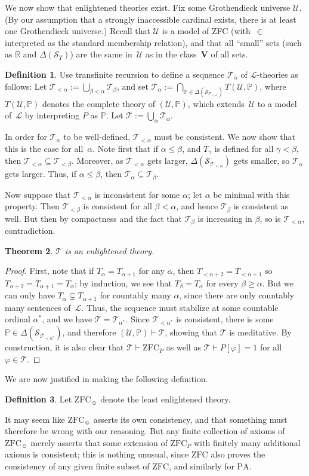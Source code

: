 \documentclass[12pt]{article}
\newcommand{\PP}{\mathbb{P}}
\newcommand{\vp}{\varphi}
\newcommand{\RR}{\mathbb{R}}
\newcommand{\zfc}{\mathrm{ZFC}}
\newcommand{\zfcp}{{\zfc_P}}
\newcommand{\zfch}{{\zfc_{\smiley}}}
\newcommand{\pa}{\mathrm{PA}}
\newcommand{\cL}{\mathcal{L}}
\newcommand{\cS}{\mathcal{S}}
\newcommand{\cT}{\mathcal{T}}
\newcommand{\cU}{\mathcal{U}}
\theoremstyle{plain}
\newtheorem{theorem}{Theorem}[subsection]
\theoremstyle{definition}
\newtheorem{definition}[theorem]{Definition}
\theoremstyle{remark}
\begin{document}
We now show that enlightened theories exist.
Fix some Grothendieck universe $\cU$. (By our assumption that a strongly inaccessible cardinal exists, there is at least one Grothendieck universe.) Recall that $\cU$ is a model of ZFC (with~$\in$ interpreted as the standard membership relation), and that all ``small'' sets (such as $\RR$ and $\Delta(\cS_T)$) are the same in~$\cU$ as in the class~$\mathbf{V}$ of all sets.
\begin{definition}
Use transfinite recursion to define a sequence $\cT_\alpha$ of $\cL$-theories as follows: Let $\cT_{<\alpha} := \bigcup_{\beta<\alpha} \cT_\beta$, and set $\cT_\alpha := \bigcap_{\PP\in\Delta(\cS_{\cT_{<\alpha}})} T(\cU,\PP)$, where $T(\cU,\PP)$ denotes the complete theory of $(\cU,\PP)$, which extends~$\cU$ to a model of~$\cL$ by interpreting $P$ as $\PP$.
Let $\cT := \bigcup_\alpha \cT_\alpha$.
\end{definition}
In order for $\cT_\alpha$ to be well-defined, $\cT_{<\alpha}$ must be consistent. We now show that this is the case for all~$\alpha$.
Note first that if $\alpha\le\beta$, and $T_\gamma$ is defined for all $\gamma<\beta$, then $\cT_{<\alpha}\subseteq\cT_{<\beta}$. Moreover, as $\cT_{<\alpha}$ gets larger, $\Delta(\cS_{\cT_{<\alpha}})$ gets smaller, so $\cT_\alpha$ gets larger. Thus, if $\alpha\le\beta$, then $\cT_\alpha\subseteq\cT_\beta$.

Now suppose that $\cT_{<\alpha}$ is inconsistent for some $\alpha$; let $\alpha$ be minimal with this property. Then $\cT_{<\beta}$ is consistent for all $\beta<\alpha$, and hence $\cT_\beta$ is consistent as well. But then by compactness and the fact that $\cT_\beta$ is increasing in $\beta$, so is $\cT_{<\alpha}$, contradiction.
\begin{theorem}
$\cT$ is an enlightened theory.
\end{theorem}
\begin{proof}
First, note that if $T_{\alpha}= T_{\alpha+1}$ for any $\alpha$, then $T_{<\alpha+2} = T_{<\alpha+1}$ so $T_{\alpha+2} = T_{\alpha+1} = T_\alpha$; by induction, we see that $T_\beta = T_\alpha$ for every $\beta\ge\alpha$. But we can only have $T_{\alpha}\subsetneq T_{\alpha+1}$ for countably many $\alpha$, since there are only countably many sentences of~$\cL$. Thus, the sequence must stabilize at some countable ordinal $\alpha^*$, and we have $\cT = \cT_{\alpha^*}$. Since $\cT_{<\alpha^*}$ is consistent, there is some $\PP\in\Delta(\cS_{\cT_{<\alpha^*}})$, and therefore $(\cU,\PP)\vdash\cT$, showing that $\cT$ is meditative. By construction, it is also clear that $\cT\vdash\zfcp$ as well as $\cT\vdash P[\vp]=1$ for all $\vp\in\cT$.
\end{proof}
We are now justified in making the following definition.
\begin{definition}
Let $\zfch$ denote the least enlightened theory.
\end{definition}
It may seem like $\zfch$ asserts its own consistency, and that something must therefore be wrong with our reasoning. But any finite collection of axioms of $\zfch$ merely asserts that some extension of $\zfcp$ with finitely many additional axioms is consistent; this is nothing unusual, since $\zfc$ also proves the consistency of any given finite subset of $\zfc$, and similarly for $\pa$.
\end{document}
